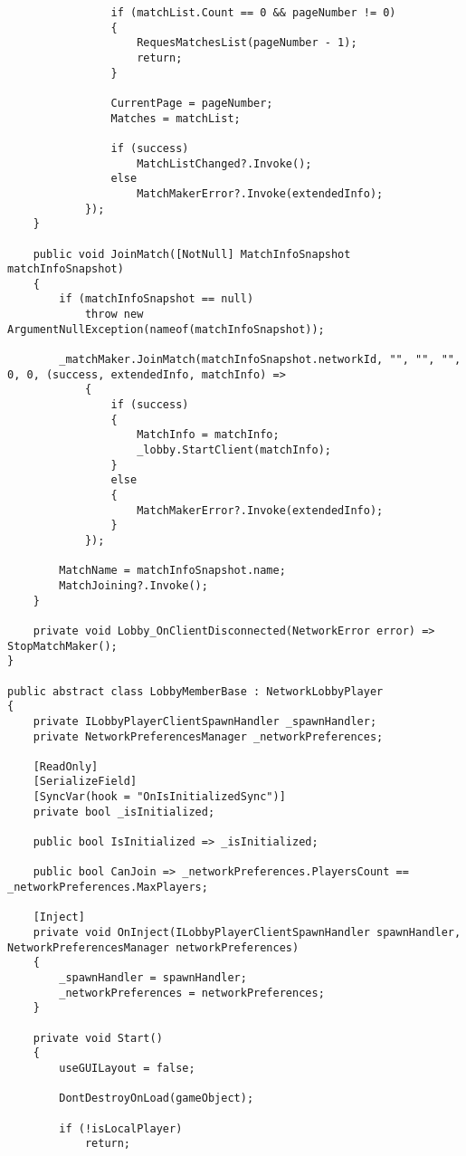 \begin{lstlisting}
                if (matchList.Count == 0 && pageNumber != 0)
                {
                    RequesMatchesList(pageNumber - 1);
                    return;
                }

                CurrentPage = pageNumber;
                Matches = matchList;

                if (success)
                    MatchListChanged?.Invoke();
                else
                    MatchMakerError?.Invoke(extendedInfo);
            });
    }

    public void JoinMatch([NotNull] MatchInfoSnapshot matchInfoSnapshot)
    {
        if (matchInfoSnapshot == null)
            throw new ArgumentNullException(nameof(matchInfoSnapshot));

        _matchMaker.JoinMatch(matchInfoSnapshot.networkId, "", "", "", 0, 0, (success, extendedInfo, matchInfo) =>
            {
                if (success)
                {
                    MatchInfo = matchInfo;
                    _lobby.StartClient(matchInfo);
                }
                else
                {
                    MatchMakerError?.Invoke(extendedInfo);
                }
            });

        MatchName = matchInfoSnapshot.name;
        MatchJoining?.Invoke();
    }

    private void Lobby_OnClientDisconnected(NetworkError error) => StopMatchMaker();
}

public abstract class LobbyMemberBase : NetworkLobbyPlayer
{
    private ILobbyPlayerClientSpawnHandler _spawnHandler;
    private NetworkPreferencesManager _networkPreferences;

    [ReadOnly]
    [SerializeField]
    [SyncVar(hook = "OnIsInitializedSync")]
    private bool _isInitialized;

    public bool IsInitialized => _isInitialized;

    public bool CanJoin => _networkPreferences.PlayersCount == _networkPreferences.MaxPlayers;

    [Inject]
    private void OnInject(ILobbyPlayerClientSpawnHandler spawnHandler, NetworkPreferencesManager networkPreferences)
    {
        _spawnHandler = spawnHandler;
        _networkPreferences = networkPreferences;
    }

    private void Start()
    {
        useGUILayout = false;

        DontDestroyOnLoad(gameObject);

        if (!isLocalPlayer)
            return;


\end{lstlisting}

